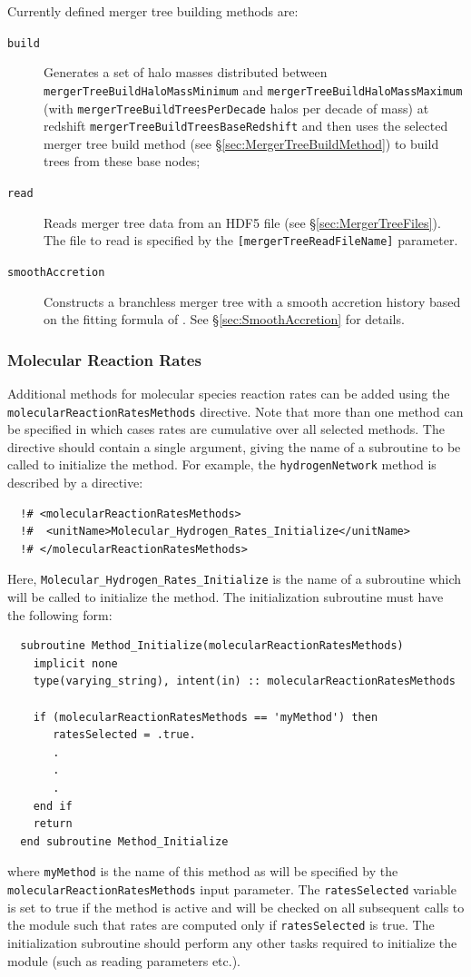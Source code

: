 Currently defined merger tree building methods are:
\begin{description}
 \item [{\tt build}] Generates a set of halo masses distributed between {\tt mergerTreeBuildHaloMassMinimum} and {\tt mergerTreeBuildHaloMassMaximum} (with {\tt mergerTreeBuildTreesPerDecade} halos per decade of mass) at redshift {\tt mergerTreeBuildTreesBaseRedshift} and then uses the selected merger tree build method (see \S\ref{sec:MergerTreeBuildMethod}) to build trees from these base nodes;
 \item [{\tt read}] Reads merger tree data from an HDF5 file (see \S\ref{sec:MergerTreeFiles}). The file to read is specified by the {\tt [mergerTreeReadFileName]} parameter.
 \item [{\tt smoothAccretion}] Constructs a branchless merger tree with a smooth accretion history based on the fitting formula of \cite{wechsler_concentrations_2002}. See \S\ref{sec:SmoothAccretion} for details.
\end{description}

\subsubsection{Molecular Reaction Rates}

Additional methods for molecular species reaction rates can be added using the {\tt molecularReactionRatesMethods} directive. Note that more than one method can be specified in which cases rates are cumulative over all selected methods. The directive should contain a single argument, giving the name of a subroutine to be called to initialize the method. For example, the {\tt hydrogenNetwork} method is described by a directive:
\begin{verbatim}
  !# <molecularReactionRatesMethods>
  !#  <unitName>Molecular_Hydrogen_Rates_Initialize</unitName>
  !# </molecularReactionRatesMethods>
\end{verbatim}
Here, {\tt Molecular\_Hydrogen\_Rates\_Initialize} is the name of a subroutine which will be called to initialize the method. The initialization subroutine must have the following form:
\begin{verbatim}
  subroutine Method_Initialize(molecularReactionRatesMethods)
    implicit none
    type(varying_string), intent(in) :: molecularReactionRatesMethods
    
    if (molecularReactionRatesMethods == 'myMethod') then
       ratesSelected = .true.
       .
       .
       .
    end if
    return
  end subroutine Method_Initialize
\end{verbatim}
where {\tt myMethod} is the name of this method as will be specified by the {\tt molecularReactionRatesMethods} input parameter. The {\tt ratesSelected} variable is set to true if the method is active and will be checked on all subsequent calls to the module such that rates are computed only if {\tt ratesSelected} is true. The initialization subroutine should perform any other tasks required to initialize the module (such as reading parameters etc.).

